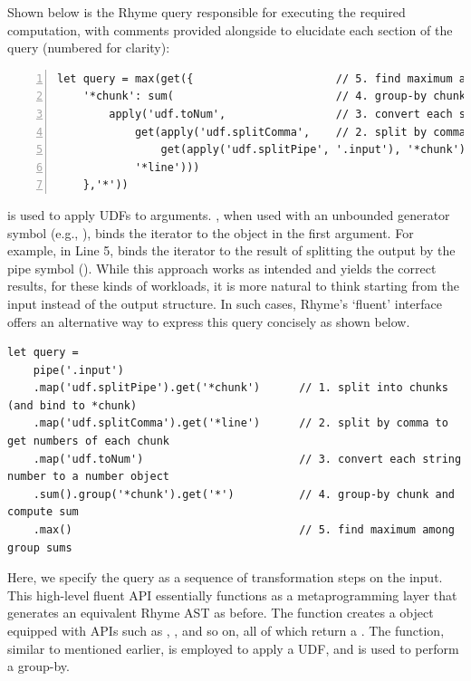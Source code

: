 \documentclass[runningheads]{llncs}
\newcommand{\lang}{Rhyme}
\begin{document}
Shown below is the \lang{} query responsible for executing the required
computation, with comments provided alongside to elucidate each section
of the query (numbered for clarity):

\begin{lstlisting}[style=JavaScript, columns=flexible, numbers=left]
let query = max(get({                      // 5. find maximum among group sums
    '*chunk': sum(                         // 4. group-by chunk and compute sum
        apply('udf.toNum',                 // 3. convert each string number to a number object
            get(apply('udf.splitComma',    // 2. split by comma to get numbers of each chunk
                get(apply('udf.splitPipe', '.input'), '*chunk')), // 1. split into chunks
            '*line')))
    },'*'))
\end{lstlisting}

 is used to apply UDFs to arguments.
, when used with an unbounded generator symbol (e.g., ), binds the
iterator to the object in the first argument.
For example, in Line 5,  binds the iterator
 to the result of splitting the output by the pipe symbol (\inline{|}).
While this approach works as intended and yields the correct results, 
for these kinds of workloads, it is more natural to think starting from the input
instead of the output structure.
In such cases, \lang{}'s `fluent' interface offers an alternative way to express
this query concisely as shown below.


\begin{lstlisting}[style=JavaScript, columns=flexible]
let query =
    pipe('.input')
    .map('udf.splitPipe').get('*chunk')      // 1. split into chunks (and bind to *chunk)
    .map('udf.splitComma').get('*line')      // 2. split by comma to get numbers of each chunk
    .map('udf.toNum')                        // 3. convert each string number to a number object
    .sum().group('*chunk').get('*')          // 4. group-by chunk and compute sum
    .max()                                   // 5. find maximum among group sums
\end{lstlisting}

Here, we specify the query as a sequence of transformation steps on the input.
This high-level fluent API essentially functions as a metaprogramming layer
that generates an equivalent \lang{} AST as before.
The  function creates a  object equipped with
APIs such as , , and so on, all of which return a
.
The  function, similar to  mentioned earlier,
is employed to apply a UDF, and  is used to perform a group-by.
\end{document}
